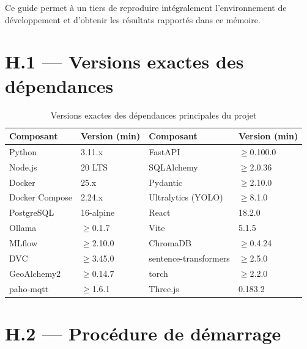 \documentclass[12pt,a4paper,twoside]{report}
\begin{document}
Ce guide permet à un tiers de reproduire intégralement l'environnement de développement
et d'obtenir les résultats rapportés dans ce mémoire.

\section*{H.1 — Versions exactes des dépendances}

\begin{table}[H]
\centering
\caption{Versions exactes des dépendances principales du projet}
\label{tab:versions}
\begin{tabular}{llll}
\toprule
\textbf{Composant} & \textbf{Version (min)} & \textbf{Composant} & \textbf{Version (min)} \\
\midrule
Python         & 3.11.x            & FastAPI            & $\geq$0.100.0 \\
Node.js        & 20 LTS            & SQLAlchemy         & $\geq$2.0.36 \\
Docker         & 25.x              & Pydantic           & $\geq$2.10.0 \\
Docker Compose & 2.24.x            & Ultralytics (YOLO) & $\geq$8.1.0 \\
PostgreSQL     & 16-alpine         & React              & 18.2.0 \\
Ollama         & $\geq$0.1.7       & Vite               & 5.1.5 \\
MLflow         & $\geq$2.10.0      & ChromaDB           & $\geq$0.4.24 \\
DVC            & $\geq$3.45.0      & sentence-transformers & $\geq$2.5.0 \\
GeoAlchemy2    & $\geq$0.14.7      & torch              & $\geq$2.2.0 \\
paho-mqtt      & $\geq$1.6.1       & Three.js           & 0.183.2 \\
\bottomrule
\end{tabular}
\end{table}

\section*{H.2 — Procédure de démarrage}
\end{document}

